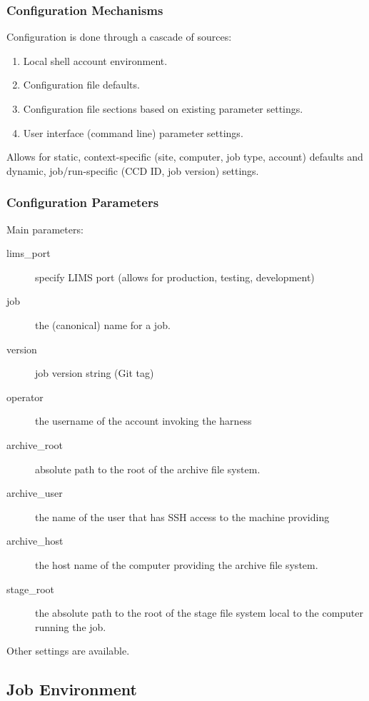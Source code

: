 \documentclass[xcolor=dvipsnames]{beamer}
\begin{document}
\begin{frame}
  \frametitle{Configuration Mechanisms}
  Configuration is done through a cascade of sources:

  \begin{enumerate}
  \item Local shell account environment.
  \item Configuration file defaults.
  \item Configuration file sections based on existing parameter
    settings.
  \item User interface (command line) parameter settings.
  \end{enumerate}

  Allows for static, context-specific (site, computer, job type,
  account) defaults and dynamic, job/run-specific (CCD ID, job
  version) settings.
  
\end{frame}
\begin{frame}
  \frametitle{Configuration Parameters}
  Main parameters:
  \begin{description}
  \item[lims\_port] specify LIMS port (allows for production, testing, development)
  \item[job] the (canonical) name for a job.
  \item[version] job version string (Git tag)
  \item[operator] the username of the account invoking the harness
  \item[archive\_root] absolute path to the root of the archive file system.
  \item[archive\_user] the name of the user that has SSH access to the machine providing
  \item[archive\_host] the host name of the computer providing the
    archive file system.
  \item[stage\_root] the absolute path to the root of the stage file
    system local to the computer running the job.
  \end{description}
  Other settings are available.
\end{frame}


\subsection{Job Environment}
\end{document}
